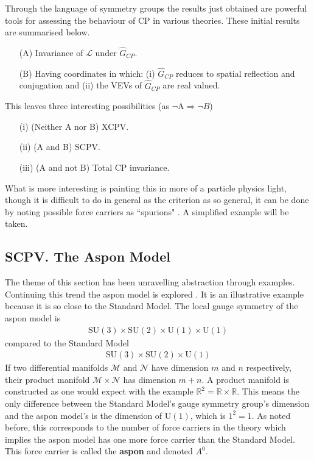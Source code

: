 Through the language of symmetry groups the results just obtained are powerful tools for assessing the behaviour of CP in various theories. These initial results are summarised below.
\begin{itemize}
\item[(A)] Invariance of $\mathcal{L}$ under $\hat{G}_{CP}$.
\item[(B)] Having coordinates in which: (i) $\hat{G}_{CP}$ reduces to spatial reflection and conjugation and (ii) the VEVs of $\hat{G}_{CP}$ are real valued.
\end{itemize}
This leaves three interesting possibilities  (as $\lnot$A$\Rightarrow\lnot B$) 
\begin{itemize}
\item[(i)] (Neither A nor B) XCPV. 
\item[(ii)] (A and B) SCPV.
\item[(iii)] (A and not B) Total CP invariance.
\end{itemize}
What is more interesting is painting this in more of a particle physics light, though it is difficult to do in general as the criterion as so general, it can be done by noting possible force carriers as ``spurions" \cite{SCPV5}. A simplified example will be taken.\\

\subsection{SCPV. The Aspon Model}

The theme of this section has been unravelling abstraction through examples. Continuing this trend the aspon model is explored \cite{SCPV7}. It is an illustrative example because it is so close to the Standard Model. The local gauge symmetry of the aspon model is
\begin{align*}
\mathrm{SU}(3) \times \mathrm{SU}(2) \times \mathrm{U}(1) \times \mathrm{U}(1)
\end{align*}
compared to the Standard Model
\begin{align*}
\mathrm{SU}(3) \times \mathrm{SU}(2) \times \mathrm{U}(1)
\end{align*}
If two differential manifolds $\mathcal{M}$ and $\mathcal{N}$ have dimension $m$ and $n$ respectively, their product manifold $\mathcal{M} \times \mathcal{N}$ has dimension $m+n$. A product manifold is constructed as one would expect with the example $\mathbb{R}^2 = \mathbb{R}\times \mathbb{R}$. This means the only difference between the Standard Model's gauge symmetry group's dimension and the aspon model's is the dimension of $\mathrm{U}(1)$, which is $1^2=1$. As noted before, this corresponds to the number of force carriers in the theory which implies the aspon model has one more force carrier than the Standard Model. This force carrier is called the \textbf{aspon} and denoted $A^0$.

